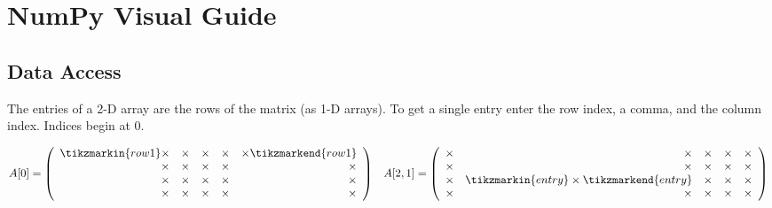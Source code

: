 \newpage

\section*{NumPy Visual Guide}


\subsection*{Data Access}

The entries of a 2-D array are the rows of the matrix (as 1-D arrays).
To get a single entry enter the row index, a comma, and the column index.
Indices begin at 0.

\begin{align*}
A[0] = \left(\begin{array}{rrrrr}
\tikzmarkin{row1}\times & \times & \times & \times & \times\tikzmarkend{row1}\\
\times & \times & \times & \times & \times\\
\times & \times & \times & \times & \times\\
\times & \times & \times & \times & \times\\
\end{array}\right)
&&
A[2,1] = \left(\begin{array}{rrrrr}
\times & \times & \times & \times & \times\\
\times & \times & \times & \times & \times\\
\times & \tikzmarkin{entry} \times \tikzmarkend{entry} & \times & \times & \times\\
\times & \times & \times & \times & \times
\end{array}\right)
\end{align*}

